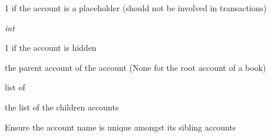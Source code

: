\documentclass[letterpaper,10pt,english]{sphinxmanual}
\begin{document}
\begin{fulllineitems}
\begin{fulllineitems}
1 if the account is a placeholder (should not be involved in transactions)

\end{fulllineitems}


\begin{fulllineitems}
\label{api/piecash.model_core.account:piecash.model_core.account.Account.hidden}
\emph{int}

1 if the account is hidden

\end{fulllineitems}


\begin{fulllineitems}
\label{api/piecash.model_core.account:piecash.model_core.account.Account.parent}
{\hyperref[api/piecash.model_core.account:piecash.model_core.account.Account]{}}

the parent account of the account (None for the root account of a book)

\end{fulllineitems}


\begin{fulllineitems}
\label{api/piecash.model_core.account:piecash.model_core.account.Account.children}
list of {\hyperref[api/piecash.model_core.account:piecash.model_core.account.Account]{}}

the list of the children accounts

\end{fulllineitems}


\begin{fulllineitems}
\label{api/piecash.model_core.account:piecash.model_core.account.Account.validate_account_name}
Ensure the account name is unique amongst its sibling accounts

\end{fulllineitems}



\end{fulllineitems}
\end{document}
